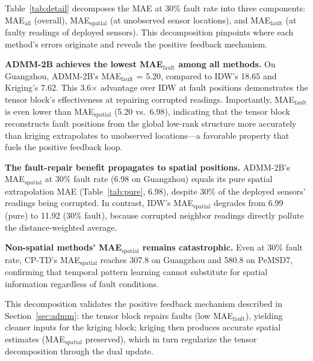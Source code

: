 \documentclass[journal]{IEEEtran}
\begin{document}
Table~\ref{tab:detail} decomposes the MAE at 30\% fault rate into three components: MAE$_{\text{all}}$ (overall), MAE$_{\text{spatial}}$ (at unobserved sensor locations), and MAE$_{\text{fault}}$ (at faulty readings of deployed sensors). This decomposition pinpoints where each method's errors originate and reveals the positive feedback mechanism.

\textbf{ADMM-2B achieves the lowest MAE$_{\text{fault}}$ among all methods.}
On Guangzhou, ADMM-2B's MAE$_{\text{fault}}$ = 5.20, compared to IDW's 18.65 and Kriging's 7.62. This 3.6$\times$ advantage over IDW at fault positions demonstrates the tensor block's effectiveness at repairing corrupted readings. Importantly, MAE$_{\text{fault}}$ is even lower than MAE$_{\text{spatial}}$ (5.20 vs.\ 6.98), indicating that the tensor block reconstructs fault positions from the global low-rank structure more accurately than kriging extrapolates to unobserved locations---a favorable property that fuels the positive feedback loop.

\textbf{The fault-repair benefit propagates to spatial positions.}
ADMM-2B's MAE$_{\text{spatial}}$ at 30\% fault rate (6.98 on Guangzhou) equals its pure spatial extrapolation MAE (Table~\ref{tab:pure}, 6.98), despite 30\% of the deployed sensors' readings being corrupted. In contrast, IDW's MAE$_{\text{spatial}}$ degrades from 6.99 (pure) to 11.92 (30\% fault), because corrupted neighbor readings directly pollute the distance-weighted average.

\textbf{Non-spatial methods' MAE$_{\text{spatial}}$ remains catastrophic.}
Even at 30\% fault rate, CP-TD's MAE$_{\text{spatial}}$ reaches 307.8 on Guangzhou and 580.8 on PeMSD7, confirming that temporal pattern learning cannot substitute for spatial information regardless of fault conditions.

This decomposition validates the positive feedback mechanism described in Section~\ref{sec:admm}: the tensor block repairs faults (low MAE$_{\text{fault}}$), yielding cleaner inputs for the kriging block; kriging then produces accurate spatial estimates (MAE$_{\text{spatial}}$ preserved), which in turn regularize the tensor decomposition through the dual update.
\end{document}

